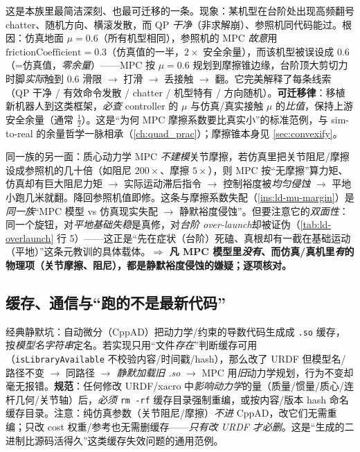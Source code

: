 \begin{insight}\label{ins:ld-mu-margin}
这是本族里最简洁深刻、也最可迁移的一条。现象：某机型在台阶处出现高频翻号 chatter、随机方向、横滚发散，而 QP \emph{干净}（非求解崩）、参照机同代码能过。根因：仿真地面 $\mu=0.6$（所有机型相同），参照机的 MPC \emph{故意}用 $\mathrm{frictionCoefficient}=0.3$（仿真值的一半，$2\times$ 安全余量），而该机型被误设成 $0.6$（=仿真值，\emph{零余量}）——MPC 按 $\mu=0.6$ 规划到摩擦锥边缘，台阶顶大剪切力时脚\emph{实际}触到 $0.6$ 滑限 $\to$ 打滑 $\to$ 丢接触 $\to$ 翻。它完美解释了每条线索（QP 干净 / 有效命令发散 / chatter / 机型特有 / 方向随机）。\textbf{可迁移律}：移植新机器人到这类框架，\emph{必查} controller 的 $\mu$ 与仿真/真实接触 $\mu$ 的\emph{比值}，保持上游安全余量（通常 $\tfrac12$）。这是“为何 MPC 摩擦系数要比真实小”的标准范例，与 sim-to-real 的余量哲学一脉相承（\cref{ch:quad_prac}）；摩擦锥本身见 \cref{sec:convexify}。
\end{insight}

\begin{insight}\label{ins:ld-joint-damping}
同一族的另一面：质心动力学 MPC \emph{不建模}关节摩擦，若仿真里把关节阻尼/摩擦设成参照机的几十倍（如阻尼 $200\times$、摩擦 $5\times$），则 MPC 按“无摩擦”算力矩、仿真却有巨大阻尼力矩 $\to$ 实际运动滞后指令 $\to$ 控制裕度被\emph{均匀侵蚀} $\to$ 平地小跑几米就翻。降回参照机值即修。这条与摩擦系数失配（\cref{ins:ld-mu-margin}）是\emph{同一族}“MPC 模型 vs 仿真现实失配 $\to$ 静默裕度侵蚀”。但要注意它的\emph{双面性}：同一个旋钮，对\emph{平地基础失稳}是真修，对\emph{台阶 over-launch}却被证伪（\cref{tab:ld-overlaunch} 行 5）——这正是“先在症状（台阶）死磕、真根却有一截在基础运动（平地）”这条元教训的具体载体。\textbf{$\Rightarrow$ 凡 MPC 模型里\emph{没有}、而仿真/真机里\emph{有}的物理项（关节摩擦、阻尼），都是静默裕度侵蚀的嫌疑；逐项核对。}
\end{insight}

\subsection{缓存、通信与“跑的不是最新代码”}
\label{subsec:ld-silent-build}

\begin{insight}\label{ins:ld-cppad-cache}
经典静默坑：自动微分（CppAD）把动力学/约束的导数代码生成成 \texttt{.so} 缓存，按\emph{模型名字符串}定名。若实现只用“文件\emph{存在}”判断缓存可用（\texttt{isLibraryAvailable} 不校验内容/时间戳/hash），那么改了 URDF 但模型名/路径不变 $\to$ 同路径 $\to$ \emph{静默加载旧 .so} $\to$ MPC 用\emph{旧}动力学规划，行为不变却毫无报错。\textbf{规范}：任何修改 URDF/xacro 中\emph{影响动力学}的量（质量/惯量/质心/连杆几何/关节轴）后，\emph{必须} \texttt{rm -rf} 缓存目录强制重编，或按内容/版本 hash 命名缓存目录。注意：纯仿真参数（关节阻尼/摩擦）\emph{不进} CppAD，改它们无需重编；只改 cost 权重/参考也无需删缓存——\emph{只有改 URDF 才必删}。这是“生成的二进制比源码活得久”这类缓存失效问题的通用范例。
\end{insight}

